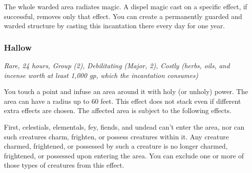 The whole warded area radiates magic. A dispel magic cast on a specific effect, if successful, removes only that effect. You can create a permanently guarded and warded structure by casting this incantation there every day for one year.

\subsubsection{Hallow}
\textit{Rare, 24 hours, Group (2), Debilitating (Major, 2), Costly (herbs, oils, and incense worth at least 1,000 gp, which the incantation consumes)}

You touch a point and infuse an area around it with holy (or unholy) power. The area can have a radius up to 60 feet. This effect does not stack even if different extra effects are chosen. The affected area is subject to the following effects.

First, celestials, elementals, fey, fiends, and undead can't enter the area, nor can such creatures charm, frighten, or possess creatures within it. Any creature charmed, frightened, or possessed by such a creature is no longer charmed, frightened, or possessed upon entering the area. You can exclude one or more of those types of creatures from this effect.


